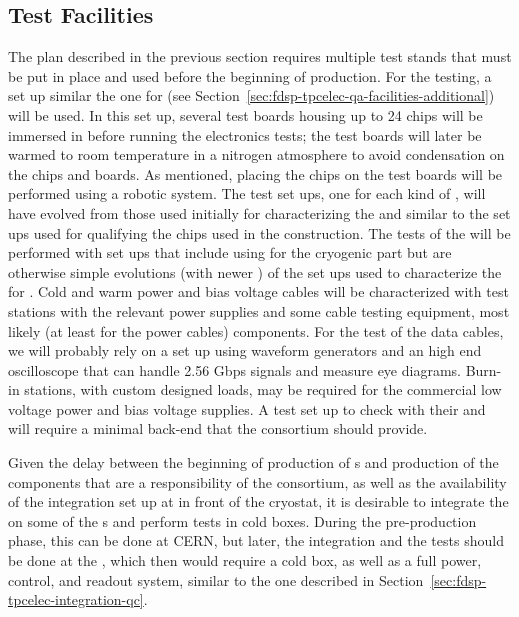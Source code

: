\subsection{Test Facilities}
\label{sec:fdsp-tpcelec-production-facilities}

The  plan described in the previous section requires
multiple test stands that must be put in place and used 
before the beginning of production. For the 
testing, a set up similar the one for  (see
Section~\ref{sec:fdsp-tpcelec-qa-facilities-additional}) will
be used. In this set up, several test boards housing up to 24
chips will be immersed in \lntwo before running the
electronics tests; the test boards will later be warmed to room temperature in 
a nitrogen atmosphere to avoid condensation on the chips and
boards. As mentioned, placing the chips on the test 
boards will be performed using a robotic system. The test set ups,
one for each kind of , will have evolved from those
used initially for characterizing the  and similar
to the set ups used for qualifying the chips used in the 
construction. The tests of the  will be performed with
set ups that include using  for the cryogenic part
but are otherwise simple evolutions (with newer )
of the set ups used to characterize the 
for . Cold and warm power and bias voltage cables will
be characterized with test stations with the relevant 
power supplies and some cable testing equipment, most likely (at least for the power cables)  components.
For the test of the data cables, we will probably rely on a set up
using waveform generators and an high end oscilloscope that 
can handle 2.56 Gbps signals and measure eye diagrams. 
Burn-in stations, with custom designed loads, may be required for 
the commercial low voltage power and bias voltage supplies.
A test set up to check  with their 
and  will require a minimal  back-end that the
 consortium should provide.

Given the delay between the beginning of production of 
s and production of the components that are a responsibility of
the  consortium, as well as the availability of the
integration set up at  in front of the cryostat, it is
desirable to  integrate the 
on some of the s and perform tests in cold
boxes. During the pre-production phase, this can be done at CERN,
but later, the integration and the
tests should be done at the , which then would require a cold box,
as well as a full power, control, and readout system, similar
to the one described in Section~\ref{sec:fdsp-tpcelec-integration-qc}.
